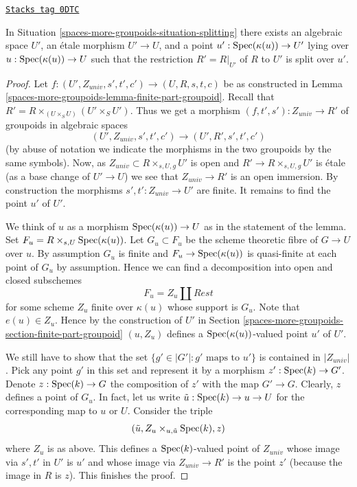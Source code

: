 \begin{lemma}

\label{spaces-more-groupoids-lemma-splitting}
\href{https://stacks.math.columbia.edu/tag/0DTC}{\texttt{Stacks tag 0DTC}}

In Situation \ref{spaces-more-groupoids-situation-splitting}
there exists an algebraic space $U'$, an \'etale morphism
$U' \to U$, and a point $u' : \operatorname{Spec}(\kappa(u)) \to U'$
lying over $u : \operatorname{Spec}(\kappa(u)) \to U$
such that the restriction $R' = R|_{U'}$ of $R$ to $U'$
is split over $u'$.
\end{lemma}

\begin{proof}
Let $f : (U', Z_{univ}, s', t', c') \to (U, R, s, t, c)$ be as constructed in
Lemma \ref{spaces-more-groupoids-lemma-finite-part-groupoid}.
Recall that $R' = R \times_{(U \times_S U)} (U' \times_S U')$.
Thus we get a morphism $(f, t', s') : Z_{univ} \to R'$ of groupoids
in algebraic spaces
$$
(U', Z_{univ}, s', t', c') \to (U', R', s', t', c')
$$
(by abuse of notation we indicate the morphisms in the two groupoids
by the same symbols). Now, as $Z_{univ} \subset R \times_{s, U, g} U'$ is open
and $R' \to R \times_{s, U, g} U'$ is \'etale (as a base change
of $U' \to U$) we see that $Z_{univ} \to R'$ is an open immersion.
By construction the morphisms $s', t' : Z_{univ} \to U'$ are finite.
It remains to find the point $u'$ of $U'$.

\medskip\noindent
We think of $u$ as a morphism $\operatorname{Spec}(\kappa(u)) \to U$ as in
the statement of the lemma. Set $F_u = R \times_{s, U} \operatorname{Spec}(\kappa(u))$.
Let $G_u \subset F_u$ be the scheme theoretic fibre of $G \to U$ over $u$.
By assumption $G_u$ is finite and $F_u \to \operatorname{Spec}(\kappa(u))$
is quasi-finite at each point of $G_u$ by assumption.
Hence we can find a decomposition into open and closed subschemes
$$
F_u = Z_u \amalg Rest
$$
for some scheme $Z_u$ finite over $\kappa(u)$ whose support is $G_u$.
Note that $e(u) \in Z_u$. Hence by the construction of $U'$ in
Section \ref{spaces-more-groupoids-section-finite-part-groupoid}
$(u, Z_u)$ defines a $\operatorname{Spec}(\kappa(u))$-valued
point $u'$ of $U'$.

\medskip\noindent
We still have to show that the set $\{g' \in |G'| : g'\text{ maps to }u'\}$
is contained in $|Z_{univ}|$. Pick any point $g'$ in this set and
represent it by a morphism $z' : \operatorname{Spec}(k) \to G'$. Denote
$z : \operatorname{Spec}(k) \to G$ the composition of $z'$ with the map $G' \to G$.
Clearly, $z$ defines a point of $G_u$. In fact, let us write
$\tilde u : \operatorname{Spec}(k) \to u \to U$ for the corresponding map to $u$ or $U$.
Consider the triple
$$
(\tilde u, Z_u \times_{u, \tilde u} \operatorname{Spec}(k), z)
$$
where $Z_u$ is as above. This defines a $\operatorname{Spec}(k)$-valued point
of $Z_{univ}$ whose image via $s', t'$ in $U'$ is $u'$ and
whose image via $Z_{univ} \to R'$ is the point $z'$
(because the image in $R$ is $z$).
This finishes the proof.
\end{proof}

